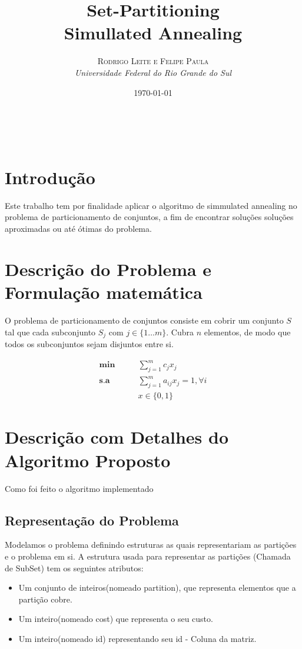 \documentclass[a4paper, 10pt]{article} %
\title{\textbf{Set-Partitioning}\\ %
Simullated Annealing} %
\author{\textsc{Rodrigo Leite e Felipe Paula} %
\\{\textit{Universidade Federal do Rio Grande do Sul}}} %
\date{\today}
\makeatletter
\renewcommand{\maketitle}{ %
\begin{flushright} %
{\LARGE\@title} %

\vspace{50pt} %

{\large\@author} 
\\\@date 

\vspace{40pt} %
\end{flushright}
}
\makeatother
\begin{document}
\maketitle

\vspace{30pt} %


\section*{Introdução}
Este trabalho tem por finalidade aplicar o algoritmo de simmulated annealing no 
problema de particionamento de conjuntos, a fim de encontrar soluções soluções aproximadas ou
até ótimas do problema.


\section*{Descrição do Problema e Formulação matemática}
O problema de particionamento de conjuntos consiste em cobrir um conjunto $S$ tal que cada subconjunto $S_j$ com $j \in \{1 \dots m\} $. Cubra $n$ elementos, de modo que todos os subconjuntos sejam disjuntos entre si.

\begin{align*}
  \textbf{min}\qquad &  \sum_{j=1}^m c_jx_j \\
  \textbf{s.a}\qquad
  & \sum_{j=1}^{m} a_{ij} x_j  = 1, \forall i \\
  & x \in \{0,1\}
\end{align*}

\section*{Descrição com Detalhes do Algoritmo Proposto}
Como foi feito o algoritmo implementado 

\subsection*{Representação do Problema}
Modelamos o problema definindo estruturas as quais representariam as partições e o problema em si.
A estrutura usada para representar as partições (Chamada de SubSet) tem os seguintes atributos:
\begin{itemize}
	\item Um conjunto de inteiros(nomeado partition), que representa elementos que a partição cobre.
	\item Um inteiro(nomeado cost) que representa o seu custo.
	\item Um inteiro(nomeado id) representando seu id - Coluna da matriz.
\end{itemize} 
\end{document}
